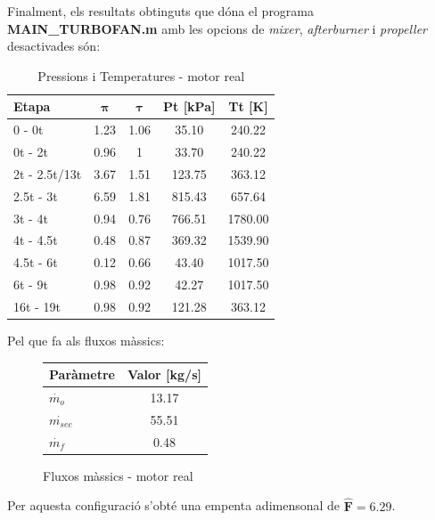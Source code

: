 Finalment, els resultats obtinguts que dóna el programa \textbf{MAIN\_TURBOFAN.m} amb les opcions de \textit{mixer}, \textit{afterburner} i \textit{propeller} desactivades són:
\begin{table}[H]
\centering
\resizebox{8cm}{!} {
\begin{tabular}{lcccc}
\toprule[3pt]
\textbf{Etapa} &\textbf{$\bm{\pi}$} & \textbf{$\bm{\tau}$}    & \textbf{Pt} [kPa]  & \textbf{Tt} [K]  \\
\midrule[1pt]
0 - 0t      & 1.23   		& 1.06  & 35.10   & 240.22             \\
0t - 2t     & 0.96   		& 1  	& 33.70   & 240.22             \\
2t - 2.5t/13t     & 3.67    & 1.51  & 123.75   & 363.12             \\
2.5t - 3t     & 6.59  		& 1.81  & 815.43  & 657.64            \\
3t - 4t     & 0.94    		& 0.76  & 766.51  & 1780.00             \\
4t - 4.5t     & 0.48        & 0.87  & 369.32  & 1539.90             \\
4.5t - 6t     & 0.12        & 0.66  & 43.40  & 1017.50             \\
6t - 9t     & 0.98          & 0.92  & 42.27  & 1017.50            \\
16t - 19t     & 0.98        & 0.92  & 121.28   & 363.12            \\
\bottomrule[2pt]
\end{tabular}
}
\caption{Pressions i Temperatures - motor real}
\end{table}
Pel que fa als fluxos màssics:
\begin{figure}[H]
	\centering
	\begin{tabular}{lc}
		\toprule[3pt]
		\textbf{Paràmetre}&\textbf{Valor [kg/s]}\\
		\midrule[1pt]
		$\dot{m_{o}}$ & 13.17 \\
		$\dot{m_{sec}}$ & 55.51 \\
		$\dot{m_{f}}$ & 0.48 \\
		\bottomrule[2pt]
	\end{tabular}
	\label{C_opti2}
	\caption{Fluxos màssics - motor real}
\end{figure}
Per aquesta configuració s'obté una empenta adimensonal de $\bm{\hat{F} = 6.29}$.
